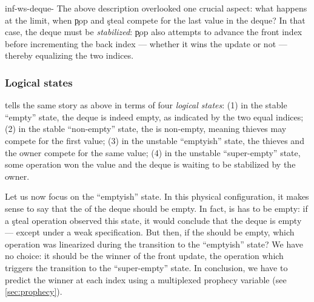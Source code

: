 \begin{tirPrefix}{inf-ws-deque-}
The above description overlooked one crucial aspect: what happens at the limit, when \c{pop} and \c{steal} compete for the last value in the deque?
In that case, the deque must be \emph{stabilized}: \c{pop} also attempts to advance the front index before incrementing the back index --- whether it wins the update or not --- thereby equalizing the two indices.

\subsubsection{Logical states}



 tells the same story as above in terms of four \emph{logical states}:
(1) in the stable ``empty'' state, the deque is indeed empty, as indicated by the two equal indices;
(2) in the stable ``non-empty'' state, the \model is non-empty, meaning thieves may compete for the first value;
(3) in the unstable ``emptyish'' state, the thieves and the owner compete for the same value;
(4) in the unstable ``super-empty'' state, some operation won the value and the deque is waiting to be stabilized by the owner.

Let us now focus on the ``emptyish'' state.
In this physical configuration, it makes sense to say that the \model of the deque should be empty.
In fact, is has to be empty: if a \c{steal} operation observed this state, it would conclude that the deque is empty --- except under a weak specification.
But then, if the \model should be empty, which operation was linearized during the transition to the ``emptyish'' state?
We have no choice: it should be the winner of the front update, \ie the operation which triggers the transition to the ``super-empty'' state.
In conclusion, we have to predict the winner at each index using a multiplexed prophecy variable (see \cref{sec:prophecy}).

\end{tirPrefix}

